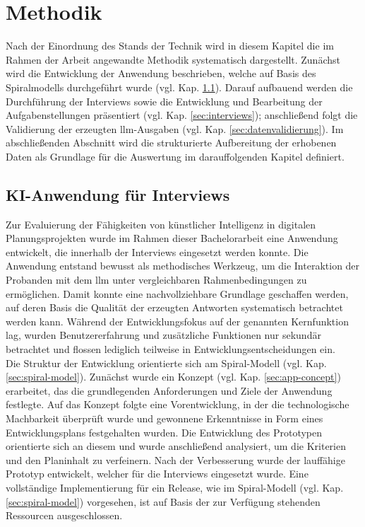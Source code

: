 \chapter{\textbf{Methodik}}
\label{chap:methods}

Nach der Einordnung des Stands der Technik wird in diesem Kapitel die im Rahmen der Arbeit angewandte Methodik systematisch dargestellt. 
Zunächst wird die Entwicklung der Anwendung beschrieben, welche auf Basis des Spiralmodells durchgeführt wurde (vgl. Kap. \ref{sec:app}).
Darauf aufbauend werden die Durchführung der Interviews sowie die Entwicklung und Bearbeitung der Aufgabenstellungen präsentiert (vgl. Kap. \ref{sec:interviews}); 
anschließend folgt die Validierung der erzeugten \gls{llm}-Ausgaben (vgl. Kap. \ref{sec:datenvalidierung}).
Im abschließenden Abschnitt wird die strukturierte Aufbereitung der erhobenen Daten als Grundlage für die Auswertung im darauffolgenden Kapitel definiert.

\section{KI-Anwendung für Interviews}
\label{sec:app}

Zur Evaluierung der Fähigkeiten von künstlicher Intelligenz in digitalen Planungsprojekten wurde im Rahmen dieser Bachelorarbeit eine Anwendung entwickelt, die innerhalb der Interviews eingesetzt werden konnte.
Die Anwendung entstand bewusst als methodisches Werkzeug, um die Interaktion der Probanden mit dem \gls{llm} unter vergleichbaren Rahmenbedingungen zu ermöglichen.
Damit konnte eine nachvollziehbare Grundlage geschaffen werden, auf deren Basis die Qualität der erzeugten Antworten systematisch betrachtet werden kann.
Während der Entwicklungsfokus auf der genannten Kernfunktion lag, wurden Benutzererfahrung und zusätzliche Funktionen nur sekundär betrachtet und flossen lediglich teilweise in Entwicklungsentscheidungen ein. \\

Die Struktur der Entwicklung orientierte sich am Spiral-Modell (vgl. Kap. \ref{sec:spiral-model}). 
Zunächst wurde ein Konzept (vgl. Kap. \ref{sec:app-concept}) erarbeitet, das die grundlegenden Anforderungen und Ziele der Anwendung festlegte.
Auf das Konzept folgte eine Vorentwicklung, in der die technologische Machbarkeit überprüft wurde und gewonnene Erkenntnisse in Form eines Entwicklungsplans festgehalten wurden.
Die Entwicklung des Prototypen orientierte sich an diesem und wurde anschließend analysiert, um die Kriterien und den Planinhalt zu verfeinern.
Nach der Verbesserung wurde der lauffähige Prototyp entwickelt, welcher für die Interviews eingesetzt wurde.
Eine vollständige Implementierung für ein Release, wie im Spiral-Modell (vgl. Kap. \ref{sec:spiral-model}) vorgesehen, ist auf Basis der zur Verfügung stehenden Ressourcen ausgeschlossen. \\

